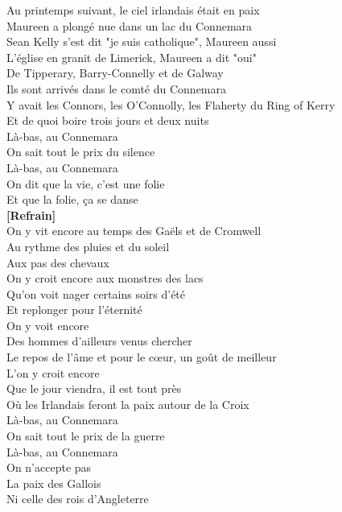 \documentclass{novel}
\begin{document}
Au printemps suivant, le ciel irlandais était en paix \\
Maureen a plongé nue dans un lac du Connemara \\
Sean Kelly s'est dit "je suis catholique", Maureen aussi \\
L'église en granit de Limerick, Maureen a dit "oui" \\
De Tipperary, Barry-Connelly et de Galway \\
Ils sont arrivés dans le comté du Connemara \\
Y avait les Connors, les O'Connolly, les Flaherty du Ring of Kerry \\
Et de quoi boire trois jours et deux nuits \\

Là-bas, au Connemara \\
On sait tout le prix du silence \\
Là-bas, au Connemara \\
On dit que la vie, c'est une folie \\
Et que la folie, ça se danse \\

\textbf{[Refrain]}\\

On y vit encore au temps des Gaëls et de Cromwell \\
Au rythme des pluies et du soleil \\
Aux pas des chevaux \\
On y croit encore aux monstres des lacs \\
Qu'on voit nager certains soirs d'été \\
Et replonger pour l'éternité \\
On y voit encore \\
Des hommes d'ailleurs venus chercher \\
Le repos de l'âme et pour le cœur, un goût de meilleur \\
L'on y croit encore \\
Que le jour viendra, il est tout près \\
Où les Irlandais feront la paix autour de la Croix \\

Là-bas, au Connemara \\
On sait tout le prix de la guerre \\
Là-bas, au Connemara \\
On n'accepte pas \\
La paix des Gallois \\
Ni celle des rois d'Angleterre
\end{document}
